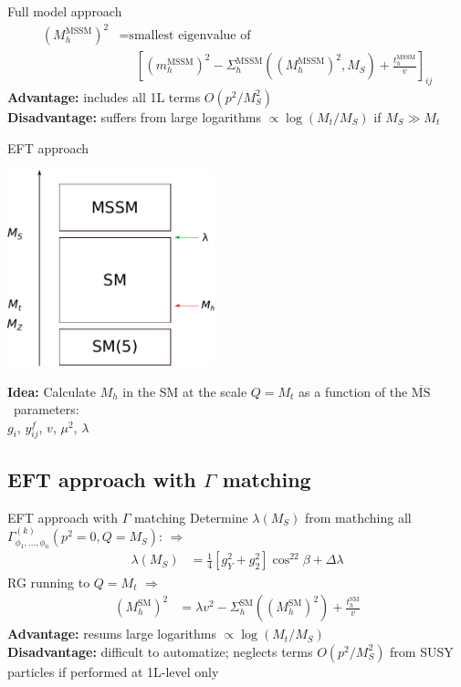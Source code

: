 \documentclass[hyperref={pdfpagelabels=false},ngerman]{beamer}
\renewcommand{\emph}{\textbf}
\newcommand{\MSbar}{\ensuremath{\overline{\text{MS}}}}
\newcommand{\SM}{\ensuremath{\text{SM}}}
\begin{document}
\begin{frame}{Full model approach}
  \begin{align*}
    (M_h^\text{MSSM})^2 &= \text{smallest eigenvalue of} \\
    &\phantom{={}} \left[(m_h^\text{MSSM})^2 - \Sigma^\text{MSSM}_h((M_h^\text{MSSM})^2,M_S)
      + \frac{t_h^\text{MSSM}}{v}\right]_{ij}
  \end{align*}
  \emph{Advantage:} includes all 1L terms $O(p^2/M_S^2)$\\
  \emph{Disadvantage:} suffers from large logarithms $\propto\log(M_t/M_S)$ if $M_S\gg M_t$\\
\end{frame}


\begin{frame}{EFT approach}
  \begin{center}
    \includegraphics[width=0.45\textwidth]{images/mssm-sm-tower-eft}\\[1em]
  \end{center}
  \emph{Idea:} Calculate $M_h$ in the SM at the scale $Q = M_t$ as a function of the \MSbar\ parameters:\\[1em]
  \centering $g_i$, $y^f_{ij}$, $v$, $\mu^2$, $\lambda$
\end{frame}


\subsection{EFT approach with $\Gamma$ matching}

\begin{frame}{EFT approach with $\Gamma$ matching}
  Determine $\lambda(M_S)$ from mathching all
  $\Gamma_{\phi_1,\ldots,\phi_n}^{(k)}(p^2 = 0, Q = M_S)$: $\Rightarrow$
  \begin{align*}
    \lambda (M_S) &= \frac{1}{4}\left[g_Y^{2} + g_2^2\right] \cos^22\beta
    + \Delta \lambda
  \end{align*}
  RG running to $Q=M_t$ $\Rightarrow$
  \begin{align*}
    (M_h^\SM)^2 &= \lambda v^2 - \Sigma^\SM_h((M_h^\SM)^2) + \frac{t_h^\SM}{v}
  \end{align*}
  \emph{Advantage:} resums large logarithms $\propto\log(M_t/M_S)$\\
  \emph{Disadvantage:} difficult to automatize; neglects terms
  $O(p^2/M_S^2)$ from SUSY particles if performed at 1L-level only
\end{frame}
\end{document}
